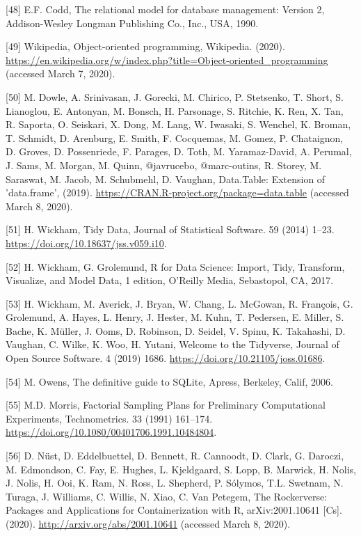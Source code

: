 \documentclass[3p, times]{elsarticle} %
\begin{document}
\leavevmode\hypertarget{ref-Codd1990}{}%
{[}48{]} E.F. Codd, The relational model for database management: Version 2, Addison-Wesley Longman Publishing Co., Inc., USA, 1990.

\leavevmode\hypertarget{ref-Wikipedia2020}{}%
{[}49{]} Wikipedia, Object-oriented programming, Wikipedia. (2020). \url{https://en.wikipedia.org/w/index.php?title=Object-oriented_programming} (accessed March 7, 2020).

\leavevmode\hypertarget{ref-Dowle2019}{}%
{[}50{]} M. Dowle, A. Srinivasan, J. Gorecki, M. Chirico, P. Stetsenko, T. Short, S. Lianoglou, E. Antonyan, M. Bonsch, H. Parsonage, S. Ritchie, K. Ren, X. Tan, R. Saporta, O. Seiskari, X. Dong, M. Lang, W. Iwasaki, S. Wenchel, K. Broman, T. Schmidt, D. Arenburg, E. Smith, F. Cocquemas, M. Gomez, P. Chataignon, D. Groves, D. Possenriede, F. Parages, D. Toth, M. Yaramaz-David, A. Perumal, J. Sams, M. Morgan, M. Quinn, @javrucebo, @marc-outins, R. Storey, M. Saraswat, M. Jacob, M. Schubmehl, D. Vaughan, Data.Table: Extension of 'data.frame', (2019). \url{https://CRAN.R-project.org/package=data.table} (accessed March 8, 2020).

\leavevmode\hypertarget{ref-Wickham2014}{}%
{[}51{]} H. Wickham, Tidy Data, Journal of Statistical Software. 59 (2014) 1--23. \url{https://doi.org/10.18637/jss.v059.i10}.

\leavevmode\hypertarget{ref-Wickham2017}{}%
{[}52{]} H. Wickham, G. Grolemund, R for Data Science: Import, Tidy, Transform, Visualize, and Model Data, 1 edition, O'Reilly Media, Sebastopol, CA, 2017.

\leavevmode\hypertarget{ref-Wickham2019}{}%
{[}53{]} H. Wickham, M. Averick, J. Bryan, W. Chang, L. McGowan, R. François, G. Grolemund, A. Hayes, L. Henry, J. Hester, M. Kuhn, T. Pedersen, E. Miller, S. Bache, K. Müller, J. Ooms, D. Robinson, D. Seidel, V. Spinu, K. Takahashi, D. Vaughan, C. Wilke, K. Woo, H. Yutani, Welcome to the Tidyverse, Journal of Open Source Software. 4 (2019) 1686. \url{https://doi.org/10.21105/joss.01686}.

\leavevmode\hypertarget{ref-Owens2006}{}%
{[}54{]} M. Owens, The definitive guide to SQLite, Apress, Berkeley, Calif, 2006.

\leavevmode\hypertarget{ref-Morris1991}{}%
{[}55{]} M.D. Morris, Factorial Sampling Plans for Preliminary Computational Experiments, Technometrics. 33 (1991) 161--174. \url{https://doi.org/10.1080/00401706.1991.10484804}.

\leavevmode\hypertarget{ref-Nust2020}{}%
{[}56{]} D. Nüst, D. Eddelbuettel, D. Bennett, R. Cannoodt, D. Clark, G. Daroczi, M. Edmondson, C. Fay, E. Hughes, L. Kjeldgaard, S. Lopp, B. Marwick, H. Nolis, J. Nolis, H. Ooi, K. Ram, N. Ross, L. Shepherd, P. Sólymos, T.L. Swetnam, N. Turaga, J. Williams, C. Willis, N. Xiao, C. Van Petegem, The Rockerverse: Packages and Applications for Containerization with R, arXiv:2001.10641 {[}Cs{]}. (2020). \url{http://arxiv.org/abs/2001.10641} (accessed March 8, 2020).
\end{document}
